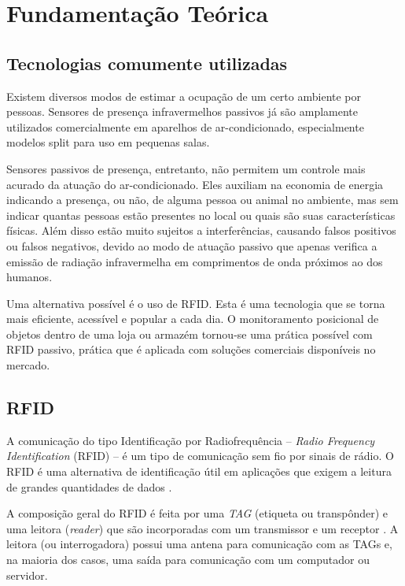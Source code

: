 
\chapter{Fundamentação Teórica\label{chap:Fundamentacao}}


\section{Tecnologias comumente utilizadas}
 
 Existem diversos modos de estimar a ocupação de um certo ambiente por pessoas. Sensores de presença infravermelhos passivos já são amplamente utilizados comercialmente em aparelhos de ar-condicionado, especialmente modelos split para uso em pequenas salas.
 
 Sensores passivos de presença, entretanto, não permitem um controle mais acurado da atuação do ar-condicionado. Eles auxiliam na economia de energia indicando a presença, ou não, de alguma pessoa ou animal no ambiente, mas sem indicar quantas pessoas estão presentes no local ou quais são suas características físicas. Além disso estão muito sujeitos a interferências, causando falsos positivos ou falsos negativos, devido ao modo de atuação passivo que apenas verifica a emissão de radiação infravermelha em comprimentos de onda próximos ao dos humanos.

 Uma alternativa possível é o uso de RFID. Esta é uma tecnologia que se torna mais eficiente, acessível e popular a cada dia. O monitoramento posicional de objetos dentro de uma loja ou armazém tornou-se uma prática possível com RFID passivo, prática que é aplicada com soluções comerciais disponíveis no mercado.
 
\section{RFID}

A comunicação do tipo Identificação por Radiofrequência – \textit{Radio Frequency Identification} (RFID) – é um tipo de comunicação sem fio por sinais de rádio. O RFID é uma alternativa de identificação útil em aplicações que exigem a leitura de grandes quantidades de dados \cite{rao1999overview}. 

A composição geral do RFID é feita por uma \textit{TAG} (etiqueta ou transpônder) e uma leitora (\textit{reader}) que são incorporadas com um transmissor e um receptor \cite{EPC-RFID-link}. A leitora (ou interrogadora) possui uma antena para comunicação com as TAGs e, na maioria dos casos, uma saída para comunicação com um computador ou servidor.

